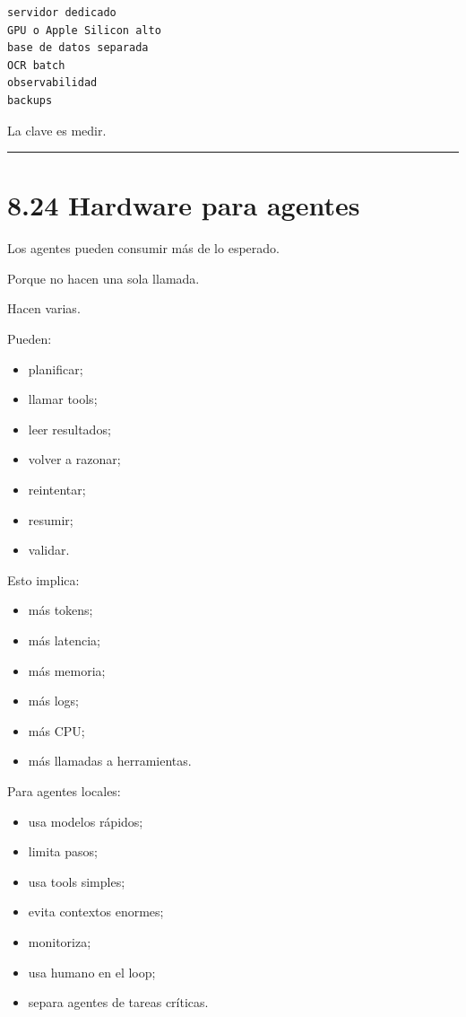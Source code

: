 \begin{lstlisting}
servidor dedicado
GPU o Apple Silicon alto
base de datos separada
OCR batch
observabilidad
backups
\end{lstlisting}

La clave es medir.

\begin{center}\rule{0.5\linewidth}{0.5pt}\end{center}

\section{8.24 Hardware para agentes}\label{hardware-para-agentes}

Los agentes pueden consumir más de lo esperado.

Porque no hacen una sola llamada.

Hacen varias.

Pueden:

\begin{itemize}
\tightlist
\item
  planificar;
\item
  llamar tools;
\item
  leer resultados;
\item
  volver a razonar;
\item
  reintentar;
\item
  resumir;
\item
  validar.
\end{itemize}

Esto implica:

\begin{itemize}
\tightlist
\item
  más tokens;
\item
  más latencia;
\item
  más memoria;
\item
  más logs;
\item
  más CPU;
\item
  más llamadas a herramientas.
\end{itemize}

Para agentes locales:

\begin{itemize}
\tightlist
\item
  usa modelos rápidos;
\item
  limita pasos;
\item
  usa tools simples;
\item
  evita contextos enormes;
\item
  monitoriza;
\item
  usa humano en el loop;
\item
  separa agentes de tareas críticas.
\end{itemize}

